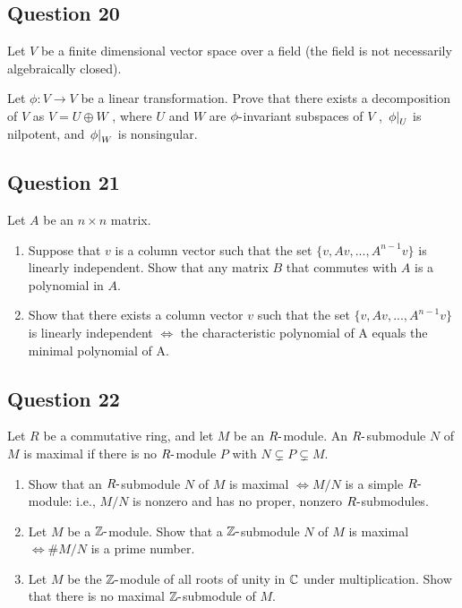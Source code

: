 \documentclass[12pt]{article}
\begin{document}
\hypertarget{question-20}{%
\subsection{Question 20}\label{question-20}}

Let \(V\) be a finite dimensional vector space over a field (the field
is not necessarily algebraically closed).

Let \(\phi : V \to V\) be a linear transformation. Prove that there
exists a decomposition of \(V\) as \(V = U \oplus W\) , where \(U\) and
\(W\) are \(\phi{\hbox{-}}\)invariant subspaces of \(V\) ,
\({\left.{\phi}\right|_{U}}\) is nilpotent, and
\({\left.{\phi}\right|_{W}}\) is nonsingular.

\hypertarget{question-21}{%
\subsection{Question 21}\label{question-21}}

Let \(A\) be an \(n \times n\) matrix.

\begin{enumerate}
\def\labelenumi{(\alph{enumi})}
\item
  Suppose that \(v\) is a column vector such that the set
  \(\{v, Av, . . . , A^{n-1} v\}\) is linearly independent. Show that
  any matrix \(B\) that commutes with \(A\) is a polynomial in \(A\).
\item
  Show that there exists a column vector \(v\) such that the set
  \(\{v, Av, . . . , A^{n-1} v\}\) is linearly independent \(\iff\) the
  characteristic polynomial of A equals the minimal polynomial of A.
\end{enumerate}

\hypertarget{question-22}{%
\subsection{Question 22}\label{question-22}}

Let \(R\) be a commutative ring, and let \(M\) be an \(R{\hbox{-}}\)module.
An \(R{\hbox{-}}\)submodule \(N\) of \(M\) is maximal if there is no
\(R{\hbox{-}}\)module \(P\) with \(N \subsetneq P \subsetneq M\).

\begin{enumerate}
\def\labelenumi{(\alph{enumi})}
\item
  Show that an \(R{\hbox{-}}\)submodule \(N\) of \(M\) is maximal
  \(\iff M /N\) is a simple \(R{\hbox{-}}\)module: i.e., \(M /N\) is nonzero
  and has no proper, nonzero \(R{\hbox{-}}\)submodules.
\item
  Let \(M\) be a \({\mathbb{Z}}{\hbox{-}}\)module. Show that a \({\mathbb{Z}}{\hbox{-}}\)submodule
  \(N\) of \(M\) is maximal \(\iff \#M /N\) is a prime number.
\item
  Let \(M\) be the \({\mathbb{Z}}{\hbox{-}}\)module of all roots of unity in \({\mathbb{C}}\)
  under multiplication. Show that there is no maximal
  \({\mathbb{Z}}{\hbox{-}}\)submodule of \(M\).
\end{enumerate}
\end{document}
